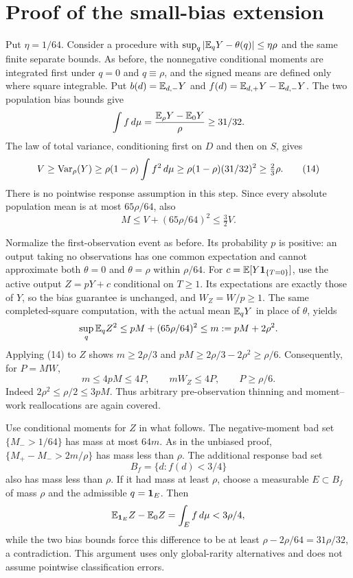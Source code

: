 \section{Proof of the small-bias extension}
Put $\eta=1/64$. Consider a procedure with
$\sup_q|\mathbb E_qY-\theta(q)|\le\eta\rho$ and the same finite separate bounds.
As before, the nonnegative conditional moments are integrated first under
$q=0$ and $q\equiv\rho$, and the signed means are defined only where square
integrable. Put $b(d)=\mathbb E_{d,-}Y$ and
$f(d)=\mathbb E_{d,+}Y-\mathbb E_{d,-}Y$. The two population bias bounds give
\[
 \int f\,d\mu=\frac{\mathbb E_\rho Y-\mathbb E_0Y}{\rho}\ge31/32.
\]
The law of total variance, conditioning first on $D$ and then on $S$, gives
\[
 V\ge\operatorname{Var}_\rho(Y)
 \ge\rho(1-\rho)\int f^2\,d\mu
 \ge\rho(1-\rho)(31/32)^2\ge\tfrac23\rho.                \tag{14}
\]
There is no pointwise response assumption in this step. Since every absolute
population mean is at most $65\rho/64$, also
\[
 M\le V+(65\rho/64)^2\le\tfrac32 V.                     \tag{15}
\]

Normalize the first-observation event as before. Its probability $p$ is
positive: an output taking no observations has one common expectation and
cannot approximate both $\theta=0$ and $\theta=\rho$ within $\rho/64$.
For $c=\mathbb E[Y\mathbf1_{\{T=0\}}]$, use the active output $Z=pY+c$ conditional on
$T\ge1$. Its expectations are exactly those of $Y$, so the bias guarantee is
unchanged, and $W_Z=W/p\ge1$. The same completed-square computation, with
the actual mean $\mathbb E_qY$ in place of $\theta$, yields
\[
 \sup_q\mathbb E_qZ^2\le pM+(65\rho/64)^2\le m:=pM+2\rho^2.
\]
Applying (14) to $Z$ shows
$m\ge2\rho/3$ and $pM\ge2\rho/3-2\rho^2\ge\rho/6$.
Consequently, for $P=MW$,
\[
 m\le4pM\le4P,\qquad mW_Z\le4P,\qquad P\ge\rho/6.       \tag{16}
\]
Indeed $2\rho^2\le\rho/2\le3pM$. Thus arbitrary pre-observation thinning
and moment--work reallocations are again covered.

Use conditional moments for $Z$ in what follows. The negative-moment bad set
$\{M_->1/64\}$ has mass at most $64m$. As in the unbiased proof,
$\{M_+-M_->2m/\rho\}$ has mass less than $\rho$.
The additional response bad set
\[
 B_f=\{d:f(d)<3/4\}
\]
also has mass less than $\rho$. If it had mass at least $\rho$, choose a
measurable $E\subset B_f$ of mass $\rho$ and the admissible $q=\mathbf1_E$.
Then
\[
 \mathbb E_{\mathbf1_E}Z-\mathbb E_0Z=\int_E f\,d\mu<3\rho/4,
\]
while the two bias bounds force this difference to be at least
$\rho-2\rho/64=31\rho/32$, a contradiction. This argument uses only
global-rarity alternatives and does not assume pointwise classification errors.

